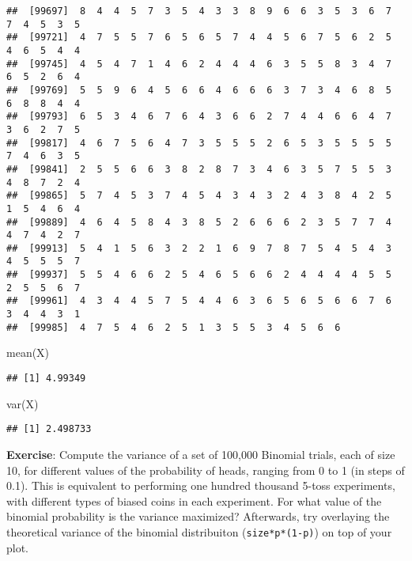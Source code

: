 \documentclass[
]{book}
\newenvironment{Shaded}{\begin{snugshade}}{\end{snugshade}}
\newcommand{\FunctionTok}[1]{\textcolor[rgb]{0.00,0.00,0.00}{#1}}
\newcommand{\NormalTok}[1]{#1}
\begin{document}
\begin{verbatim}
##  [99697]  8  4  4  5  7  3  5  4  3  3  8  9  6  6  3  5  3  6  7  7  4  5  3  5
##  [99721]  4  7  5  5  7  6  5  6  5  7  4  4  5  6  7  5  6  2  5  4  6  5  4  4
##  [99745]  4  5  4  7  1  4  6  2  4  4  4  6  3  5  5  8  3  4  7  6  5  2  6  4
##  [99769]  5  5  9  6  4  5  6  6  4  6  6  6  3  7  3  4  6  8  5  6  8  8  4  4
##  [99793]  6  5  3  4  6  7  6  4  3  6  6  2  7  4  4  6  6  4  7  3  6  2  7  5
##  [99817]  4  6  7  5  6  4  7  3  5  5  5  2  6  5  3  5  5  5  5  7  4  6  3  5
##  [99841]  2  5  5  6  6  3  8  2  8  7  3  4  6  3  5  7  5  5  3  4  8  7  2  4
##  [99865]  5  7  4  5  3  7  4  5  4  3  4  3  2  4  3  8  4  2  5  1  5  4  6  4
##  [99889]  4  6  4  5  8  4  3  8  5  2  6  6  6  2  3  5  7  7  4  4  7  4  2  7
##  [99913]  5  4  1  5  6  3  2  2  1  6  9  7  8  7  5  4  5  4  3  4  5  5  5  7
##  [99937]  5  5  4  6  6  2  5  4  6  5  6  6  2  4  4  4  4  5  5  2  5  5  6  7
##  [99961]  4  3  4  4  5  7  5  4  4  6  3  6  5  6  5  6  6  7  6  3  4  4  3  1
##  [99985]  4  7  5  4  6  2  5  1  3  5  5  3  4  5  6  6
\end{verbatim}

\begin{Shaded}
\begin{Highlighting}[]
\FunctionTok{mean}\NormalTok{(X)}
\end{Highlighting}
\end{Shaded}

\begin{verbatim}
## [1] 4.99349
\end{verbatim}

\begin{Shaded}
\begin{Highlighting}[]
\FunctionTok{var}\NormalTok{(X)}
\end{Highlighting}
\end{Shaded}

\begin{verbatim}
## [1] 2.498733
\end{verbatim}

\textbf{Exercise}: Compute the variance of a set of 100,000 Binomial trials, each of size 10, for different values of the probability of heads, ranging from 0 to 1 (in steps of 0.1). This is equivalent to performing one hundred thousand 5-toss experiments, with different types of biased coins in each experiment. For what value of the binomial probability is the variance maximized? Afterwards, try overlaying the theoretical variance of the binomial distribuiton (\texttt{size*p*(1-p)}) on top of your plot.
\end{document}
